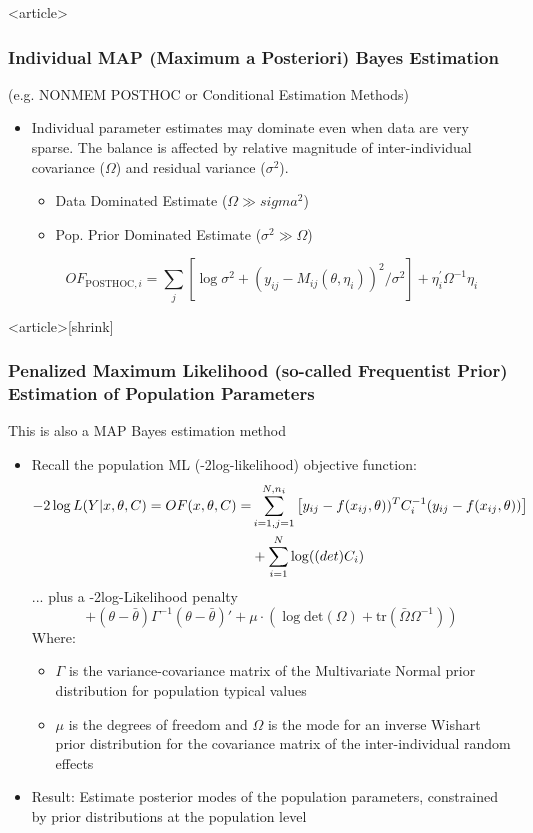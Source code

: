 \documentclass{beamer}
\begin{document}
\begin{frame}<article>
  \frametitle{Individual MAP (Maximum a Posteriori) Bayes Estimation}
  
(e.g. NONMEM POSTHOC or Conditional Estimation Methods)

\begin{itemize}
\item Individual parameter estimates may dominate even when data are very sparse. The balance is affected by relative magnitude of inter-individual covariance ($\Omega$) and residual variance ($\sigma^2$). 
\begin{itemize}
\item Data Dominated Estimate ($\Omega \gg sigma^2$)
\item Pop. Prior Dominated Estimate ($\sigma^2 \gg \Omega$)
\end{itemize}
$$ OF_{\text{POSTHOC},i} = \sum_j\left[\log \sigma^2 + (y_{ij} - M_{ij}(\theta,\eta_i))^2/\sigma^2\right] + \eta_i^\prime\Omega^{-1}\eta_i$$
\end{itemize}

\end{frame}

\begin{frame}<article>[shrink]
  \frametitle{Penalized Maximum Likelihood (so-called Frequentist
    Prior) Estimation of Population Parameters}
  
This is also a MAP Bayes estimation method

\begin{itemize}
\item Recall the population ML (-2log-likelihood) objective function:
  \begin{align*}
     -2\log L(Y|x,\theta,C) = OF(x,\theta,C) = &
     \sum_{i=1,j=1}^{N,n_i}\left[y_{ij}-f(x_{ij},\theta))^TC_i^{-1}(y_{ij}-f(x_{ij},\theta))\right] \\
     &+ \sum_{i=1}^N\log(\text(det)C_i)
  \end{align*}
... plus a -2log-Likelihood penalty
$$ + (\theta - \bar{\theta})\Gamma^{-1}(\theta - \bar{\theta})' + \mu \cdot (\log\text{det}(\Omega)+\text{tr}(\bar{\Omega}\Omega^{-1}))$$
Where:
\begin{itemize}
\item $\Gamma$ is the variance-covariance matrix of the Multivariate Normal prior distribution for population typical values
\item $\mu$ is the degrees of freedom and $\Omega$ is the mode for an inverse Wishart prior distribution for the covariance matrix of the inter-individual random effects
\end{itemize}
\item Result: Estimate posterior modes of the population parameters, constrained by prior distributions at the population level
\end{itemize}

\end{frame}
\end{document}
